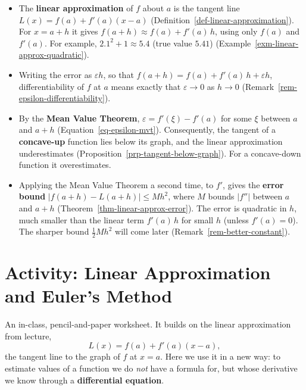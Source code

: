 \documentclass[
  letterpaper,
  DIV=11,
  numbers=noendperiod]{scrreprt}
\providecommand{\tightlist}{%
  \setlength{\itemsep}{0pt}\setlength{\parskip}{0pt}}
\theoremstyle{plain}
\theoremstyle{plain}
\theoremstyle{definition}
\theoremstyle{definition}
\theoremstyle{definition}
\theoremstyle{plain}
\theoremstyle{plain}
\theoremstyle{remark}
\begin{document}
\begin{itemize}
\tightlist
\item
  The \textbf{linear approximation} of \(f\) about \(a\) is the tangent
  line \(L(x) = f(a) + f'(a)(x-a)\)
  (Definition~\ref{def-linear-approximation}). For \(x=a+h\) it gives
  \(f(a+h)\approx f(a) + f'(a)\,h\), using only \(f(a)\) and \(f'(a)\).
  For example, \(2.1^2+1\approx 5.4\) (true value \(5.41\))
  (Example~\ref{exm-linear-approx-quadratic}).
\item
  Writing the error as \(\varepsilon h\), so that
  \(f(a+h) = f(a) + f'(a)\,h + \varepsilon h\), differentiability of
  \(f\) at \(a\) means exactly that \(\varepsilon\to0\) as \(h\to0\)
  (Remark~\ref{rem-epsilon-differentiability}).
\item
  By the \textbf{Mean Value Theorem}, \(\varepsilon= f'(\xi)-f'(a)\) for
  some \(\xi\) between \(a\) and \(a+h\)
  (Equation~\ref{eq-epsilon-mvt}). Consequently, the tangent of a
  \textbf{concave-up} function lies below its graph, and the linear
  approximation underestimates
  (Proposition~\ref{prp-tangent-below-graph}). For a concave-down
  function it overestimates.
\item
  Applying the Mean Value Theorem a second time, to \(f'\), gives the
  \textbf{error bound} \(\lvert f(a+h)-L(a+h) \rvert\le M h^2\), where
  \(M\) bounds \(\lvert f'' \rvert\) between \(a\) and \(a+h\)
  (Theorem~\ref{thm-linear-approx-error}). The error is quadratic in
  \(h\), much smaller than the linear term \(f'(a)\,h\) for small \(h\)
  (unless \(f'(a)=0\)). The sharper bound \(\frac12 Mh^2\) will come
  later (Remark~\ref{rem-better-constant}).
\end{itemize}

\chapter{Activity: Linear Approximation and Euler's
Method}\label{activity-linear-approximation-and-eulers-method}

\begin{tcolorbox}[enhanced jigsaw, arc=.35mm, bottomrule=.15mm, bottomtitle=1mm, breakable, colback=white, colbacktitle=quarto-callout-note-color!10!white, colframe=quarto-callout-note-color-frame, coltitle=black, left=2mm, leftrule=.75mm, opacityback=0, opacitybacktitle=0.6, rightrule=.15mm, title={About this activity}, titlerule=0mm, toprule=.15mm, toptitle=1mm]

An in-class, pencil-and-paper worksheet. It builds on the linear
approximation from lecture, \[
L(x) = f(a) + f'(a)(x-a),
\] the tangent line to the graph of \(f\) at \(x=a\). Here we use it in
a new way: to estimate values of a function we do \emph{not} have a
formula for, but whose derivative we know through a \textbf{differential
equation}.

\end{tcolorbox}
\end{document}
